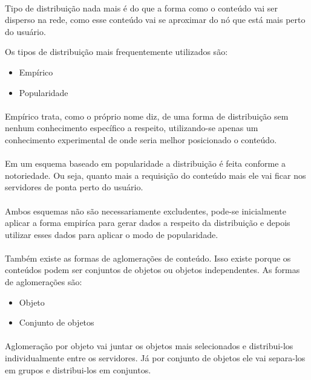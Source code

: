 \paragraph{} Tipo de distribui\c{c}\~ao nada mais \'e do que a forma como o conte\'udo vai ser disperso na rede, como esse conte\'udo vai se aproximar do n\'o que est\'a mais perto do usu\'ario. 

Os tipos de distribui\c{c}\~ao mais frequentemente utilizados s\~ao:
\begin{itemize}
	\item Emp\'irico
	\item Popularidade
\end{itemize}

\paragraph{} Emp\'irico trata, como o pr\'oprio nome diz, de uma forma de distribui\c{c}\~ao sem nenhum conhecimento espec\'ifico a respeito, utilizando-se apenas um conhecimento experimental de onde seria melhor posicionado o conte\'udo.
\paragraph{} Em um esquema baseado em popularidade a distribui\c{c}\~ao \'e feita conforme a notoriedade. Ou seja, quanto mais a requisi\c{c}\~ao do conte\'udo mais ele vai ficar nos servidores de ponta perto do usu\'ario.
\paragraph{} Ambos esquemas n\~ao s\~ao necessariamente excludentes, pode-se inicialmente aplicar a forma empir\'ica para gerar dados a respeito da distribui\c{c}\~ao e depois utilizar esses dados para aplicar o modo de popularidade.
	
\paragraph{} Tamb\'em existe as formas de aglomera\c{c}\~oes de conte\'udo. Isso existe porque os conte\'udos podem ser conjuntos de objetos ou objetos independentes. 
As formas de aglomera\c{c}\~oes s\~ao:
\begin{itemize}
	\item Objeto
	\item Conjunto de objetos
\end{itemize}

\paragraph{} Aglomera\c{c}\~ao por objeto vai juntar os objetos mais selecionados e distribui-los individualmente entre os servidores. J\'a por conjunto de objetos ele vai separa-los em grupos e distribui-los em conjuntos. 
